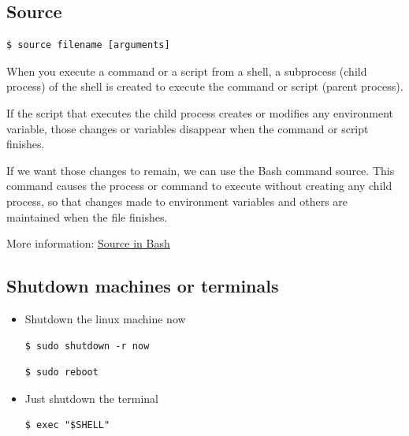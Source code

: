 \documentclass{article}
\newenvironment{codetemplate}[1][]{%
  \mybasecolorbox[#1]
  \itshape
}{%
  \endmybasecolorbox
}
\begin{document}
\subsection{Source}
\begin{codetemplate}
\begin{verbatim}
$ source filename [arguments]
\end{verbatim}
\end{codetemplate}

When you execute a command or a script from a shell, a subprocess (child process) of the shell is created to execute the command or script (parent process).

If the script that executes the child process creates or modifies any environment variable, those changes or variables disappear when the command or script finishes.

If we want those changes to remain, we can use the Bash command source. This command causes the process or command to execute without creating any child process, so that changes made to environment variables and others are maintained when the file finishes.

More information: \url{Source in Bash}

\subsection{Shutdown machines or terminals}
\begin{itemize}
    \item Shutdown the linux machine now
\begin{codetemplate}{}
\begin{verbatim}
$ sudo shutdown -r now
\end{verbatim}
\end{codetemplate}

\begin{codetemplate}{}
\begin{verbatim}
$ sudo reboot
\end{verbatim}
\end{codetemplate}

    \item Just shutdown the terminal
\begin{codetemplate}{}
\begin{verbatim}
$ exec "$SHELL"
\end{verbatim}
\end{codetemplate}
\end{itemize}
\end{document}
